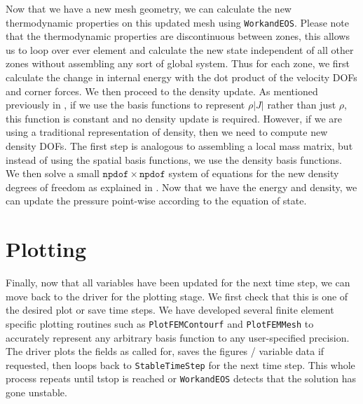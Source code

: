 Now that we have a new mesh geometry, we can calculate the new thermodynamic properties on this updated mesh using \texttt{WorkandEOS}. Please note that the thermodynamic properties are discontinuous between zones, this allows us to loop over ever element and calculate the new state independent of all other zones without assembling any sort of global system. Thus for each zone, we first calculate the change in internal energy with the dot product of the velocity DOFs and corner forces. We then proceed to the density update. As mentioned previously in , if we use the basis functions to represent $\rho |J|$ rather than just $\rho$, this function is constant and no density update is required. However, if we are using a traditional representation of density, then we need to compute new density DOFs. The first step is analogous to assembling a local mass matrix, but instead of using the spatial basis functions, we use the density basis functions. We then solve a small $\mathtt{npdof} \times \mathtt{npdof}$ system of equations for the new density degrees of freedom as explained in . Now that we have the energy and density, we can update the pressure point-wise according to the equation of state.

\section{Plotting}
Finally, now that all variables have been updated for the next time step, we can move back to the driver for the plotting stage. We first check that this is one of the desired plot or save time steps. We have developed several finite element specific plotting routines such as \texttt{PlotFEMContourf} and \texttt{PlotFEMMesh} to accurately represent any arbitrary basis function to any user-specified precision. The driver plots the fields as called for, saves the figures / variable data if requested, then loops back to \texttt{StableTimeStep} for the next time step. This whole process repeats until \textsf{tstop} is reached or \texttt{WorkandEOS} detects that the solution has gone unstable.